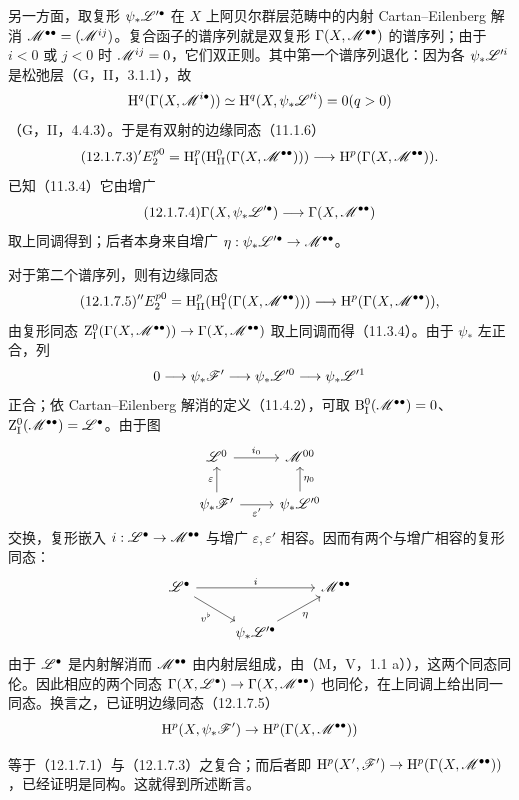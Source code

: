 另一方面，取复形 $\psi_*\mathscr L'^\bullet$ 在 $X$ 上阿贝尔群层范畴中的内射 Cartan--Eilenberg 解消 $\mathscr M^{\bullet\bullet}=(\mathscr M^{ij})$。复合函子的谱序列就是双复形 $\Gamma(X,\mathscr M^{\bullet\bullet})$ 的谱序列；由于 $i<0$ 或 $j<0$ 时 $\mathscr M^{ij}=0$，它们双正则。其中第一个谱序列退化：因为各 $\psi_*\mathscr L'^i$ 是松弛层（G，II，3.1.1），故
\[
\mathrm H^q(\Gamma(X,\mathscr M^{i\bullet}))
\simeq\mathrm H^q(X,\psi_*\mathscr L'^i)=0(q>0)
\]
（G，II，4.4.3）。于是有双射的边缘同态（11.1.6）
\begin{equation}\tag{12.1.7.3}
{}'E_2^{p0}=\mathrm H_{\mathrm I}^p(\mathrm H_{\mathrm{II}}^0(\Gamma(X,\M^{\bullet\bullet})))
\longrightarrow\mathrm H^p(\Gamma(X,\M^{\bullet\bullet})).
\end{equation}
已知（11.3.4）它由增广
\begin{equation}\tag{12.1.7.4}
\Gamma(X,\psi_*\LL'^\bullet)\longrightarrow\Gamma(X,\M^{\bullet\bullet})
\end{equation}
取上同调得到；后者本身来自增广 $\eta:\psi_*\mathscr L'^\bullet\to\mathscr M^{\bullet\bullet}$。

对于第二个谱序列，则有边缘同态
\begin{equation}\tag{12.1.7.5}
{}''E_2^{p0}=\mathrm H_{\mathrm{II}}^p(\mathrm H_{\mathrm I}^0(\Gamma(X,\M^{\bullet\bullet})))
\longrightarrow\mathrm H^p(\Gamma(X,\M^{\bullet\bullet})),
\end{equation}
由复形同态 $\mathrm Z_{\mathrm I}^0(\Gamma(X,\mathscr M^{\bullet\bullet}))\to\Gamma(X,\mathscr M^{\bullet\bullet})$ 取上同调而得（11.3.4）。由于 $\psi_*$ 左正合，列
\[
0\longrightarrow\psi_*\mathscr F'\longrightarrow\psi_*\mathscr L'^0\longrightarrow\psi_*\mathscr L'^1
\]
正合；依 Cartan--Eilenberg 解消的定义（11.4.2），可取 $\mathrm B_{\mathrm I}^0(\mathscr M^{\bullet\bullet})=0$、$\mathrm Z_{\mathrm I}^0(\mathscr M^{\bullet\bullet})=\mathscr L^\bullet$。由于图
\[
\begin{tikzcd}
\LL^0\arrow[r,"i_0"]&\M^{00}\\
\psi_*\F'\arrow[u,"\varepsilon"]\arrow[r,"\varepsilon'"']&\psi_*\LL'^0\arrow[u,"\eta_0"']
\end{tikzcd}
\]
交换，复形嵌入 $i:\mathscr L^\bullet\to\mathscr M^{\bullet\bullet}$ 与增广 $\varepsilon,\varepsilon'$ 相容。因而有两个与增广相容的复形同态：
\[
\begin{tikzcd}
\LL^\bullet\arrow[rr,"i"]\arrow[dr,"v^\flat"']&&\M^{\bullet\bullet}\\
&\psi_*\LL'^\bullet\arrow[ur,"\eta"']&
\end{tikzcd}
\]
由于 $\mathscr L^\bullet$ 是内射解消而 $\mathscr M^{\bullet\bullet}$ 由内射层组成，由（M，V，1.1 a）），这两个同态同伦。因此相应的两个同态 $\Gamma(X,\mathscr L^\bullet)\to\Gamma(X,\mathscr M^{\bullet\bullet})$ 也同伦，在上同调上给出同一同态。换言之，已证明边缘同态（12.1.7.5）
\[
\mathrm H^p(X,\psi_*\mathscr F')\to\mathrm H^p(\Gamma(X,\mathscr M^{\bullet\bullet}))
\]
\begin{sloppypar}
等于（12.1.7.1）与（12.1.7.3）之复合；而后者即 $\mathrm H^p(X',\mathscr F')\to\mathrm H^p(\Gamma(X,\mathscr M^{\bullet\bullet}))$，已经证明是同构。这就得到所述断言。\par
\end{sloppypar}


